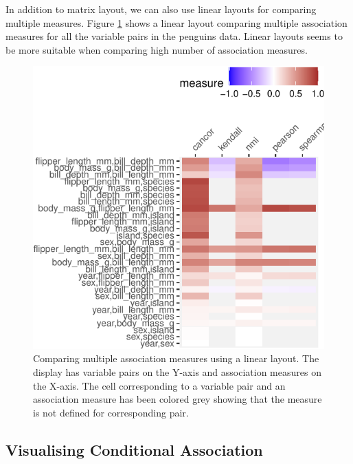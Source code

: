 In addition to matrix layout, we can also use linear layouts for
comparing multiple measures. Figure \ref{fig:compare-linear} shows a
linear layout comparing multiple association measures for all the
variable pairs in the penguins data. Linear layouts seems to be more
suitable when comparing high number of association measures.

\begin{Schunk}
\begin{figure}

{\centering \includegraphics{rj_paper_files/figure-latex/compare-linear-1} 

}

\caption[Comparing multiple association measures using a linear layout]{Comparing multiple association measures using a linear layout. The display has variable pairs on the Y-axis and association measures on the X-axis. The cell corresponding to a variable pair and an association measure has been colored grey showing that the measure is not defined for corresponding pair.}\label{fig:compare-linear}
\end{figure}
\end{Schunk}

\hypertarget{visualising-conditional-association}{%
\subsection{Visualising Conditional
Association}\label{visualising-conditional-association}}

